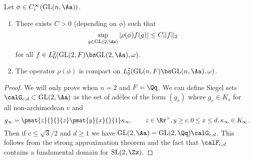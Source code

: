 \begin{proposition}
\label{compactad}
Let $\phi\in C_{c}^{\infty}(\GL(n, \Aa))$. 
\begin{enumerate}
\item There exists $C>0$ (depending on $\phi$) such that 
$$
\sup_{g\in \GL(2, \Aa)} |\rho(\phi)f(g)| \leq C||f||_{2}
$$
for all $f\in L_{0}^{2}(\GL(2, F) \bs \GL(2,\Aa), \omega)$. 
\item The operator $\rho(\phi)$ is compact on $L_{0}^{2}(\GL(n, F)\bs \GL(n, \Aa), \omega)$. 
\end{enumerate}
\end{proposition}
\begin{proof}
We will only prove when $n = 2$ and $F = \Qq$. 
We can define Siegel sets $\calG_{c, d}\subset \GL(2, \Aa)$ as the set of ad\'eles of the form $(g_{v})$ where $g_{v} \in K_v$ for all non-archimedean $v$ and 
$$
g_{\infty} = \pmat{z}{}{}{z} \pmat{y}{x}{}{1} \kappa_{\infty}, \qquad z\in \Rr^{\times}, y\geq c, 0\leq x\leq d, \kappa_{\infty} \in K_{\infty}. 
$$
Then if $c\leq \sqrt{3}/2$ and $d\geq 1$ we have $\GL(2, \Aa) = \GL(2, \Qq) \calG_{c, d}$. 
This follows from the strong approximation theorem and the fact that $\calF_{c, d}$ contains a fundamental domain for $\SL(2, \Zz)$. 


\end{proof}
